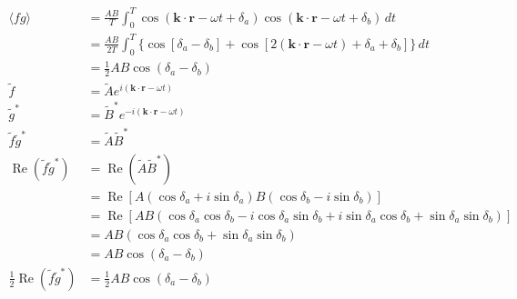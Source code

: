 \documentclass{article}
\renewcommand{\Re}{\operatorname{Re}}
\renewcommand{\vec}[1]{\boldsymbol{\mathbf{#1}}}
\begin{document}
\begin{align*}
  \langle f g \rangle                     & = \frac{A B}{T} \int_0^T \cos (\vec{k} \cdot \vec{r} - \omega t + \delta_a) \cos (\vec{k} \cdot \vec{r} - \omega t + \delta_b) \,d t    \\
                                          & = \frac{A B}{2 T} \int_0^T \{ \cos [\delta_a - \delta_b] + \cos [2 (\vec{k} \cdot \vec{r} - \omega t) + \delta_a + \delta_b]\} \,d t    \\
                                          & = \frac{1}{2} A B \cos (\delta_a - \delta_b)                                                                                            \\
  \tilde{f}                               & = \tilde{A} e^{i (\vec{k} \cdot \vec{r} - \omega t)}                                                                                    \\
  \tilde{g}^*                             & = \tilde{B}^* e^{-i (\vec{k} \cdot \vec{r} - \omega t)}                                                                                 \\
  \tilde{f} \tilde{g}^*                   & = \tilde{A} \tilde{B}^*                                                                                                                 \\
  \Re (\tilde{f} \tilde{g}^*)             & = \Re (\tilde{A} \tilde{B}^*)                                                                                                           \\
                                          & = \Re [A (\cos \delta_a + i \sin \delta_a) B (\cos \delta_b - i \sin \delta_b)]                                                         \\
                                          & = \Re [A B (\cos \delta_a \cos \delta_b - i \cos \delta_a \sin \delta_b + i \sin \delta_a \cos \delta_b + \sin \delta_a \sin \delta_b)] \\
                                          & = A B (\cos \delta_a \cos \delta_b + \sin \delta_a \sin \delta_b)                                                                       \\
                                          & = A B \cos (\delta_a - \delta_b)                                                                                                        \\
  \frac{1}{2} \Re (\tilde{f} \tilde{g}^*) & = \frac{1}{2} A B \cos (\delta_a - \delta_b)
\end{align*}
\end{document}

